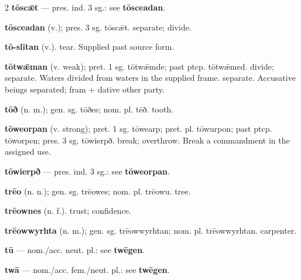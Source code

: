 \begin{multicols*}{2}
\textbf{tōscǣt} — pres. ind. 3 sg.: see \textbf{tōsceadan}.\par
\textbf{tōsceadan} (v.); pres. 3 sg. tōscǣt. separate; divide.\par
\textbf{tō-slītan} (v.). tear. Supplied past source form.\par
\textbf{tōtwǣman} (v. weak); pret. 1 sg. tōtwǣmde; past ptcp. tōtwǣmed. divide; separate. Waters divided from waters in the supplied frame. separate. Accusative beings separated; fram + dative other party.\par
\textbf{tōð} (n. m.); gen. sg. tōðes; nom. pl. tēð. tooth.\par
\textbf{tōweorpan} (v. strong); pret. 1 sg. tōwearp; pret. pl. tōwurpon; past ptcp. tōworpen; pres. 3 sg. tōwierpð. break; overthrow. Break a commandment in the assigned use.\par
\textbf{tōwierpð} — pres. ind. 3 sg.: see \textbf{tōweorpan}.\par
\textbf{trēo} (n. n.); gen. sg. trēowes; nom. pl. trēowu. tree.\par
\textbf{trēownes} (n. f.). trust; confidence.\par
\textbf{trēowwyrhta} (n. m.); gen. sg. trēowwyrhtan; nom. pl. trēowwyrhtan. carpenter.\par
\textbf{tū} — nom./acc. neut. pl.: see \textbf{twēgen}.\par
\textbf{twā} — nom./acc. fem./neut. pl.: see \textbf{twēgen}.\par

\end{multicols*}
